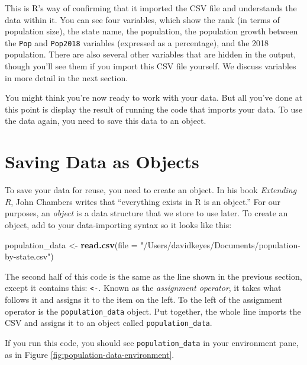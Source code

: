 \documentclass[
]{book}
\newenvironment{Shaded}{\begin{snugshade}}{\end{snugshade}}
\newcommand{\AttributeTok}[1]{\textcolor[rgb]{0.13,0.29,0.53}{#1}}
\newcommand{\FunctionTok}[1]{\textcolor[rgb]{0.13,0.29,0.53}{\textbf{#1}}}
\newcommand{\NormalTok}[1]{#1}
\newcommand{\OtherTok}[1]{\textcolor[rgb]{0.56,0.35,0.01}{#1}}
\newcommand{\StringTok}[1]{\textcolor[rgb]{0.31,0.60,0.02}{#1}}
\begin{document}
This is R's way of confirming that it imported the CSV file and understands the data within it. You can see four variables, which show the rank (in terms of population size), the state name, the population, the population growth between the \texttt{Pop} and \texttt{Pop2018} variables (expressed as a percentage), and the 2018 population. There are also several other variables that are hidden in the output, though you'll see them if you import this CSV file yourself. We discuss variables in more detail in the next section.

You might think you're now ready to work with your data. But all you've done at this point is display the result of running the code that imports your data. To use the data again, you need to save this data to an object.

\hypertarget{saving-data-as-objects}{%
\section*{Saving Data as Objects}\label{saving-data-as-objects}}

To save your data for reuse, you need to create an object. In his book \emph{Extending R}, John Chambers writes that ``everything exists in R is an object.'' For our purposes, an \emph{object} is a data structure that we store to use later. To create an object, add to your data-importing syntax so it looks like this:

\begin{Shaded}
\begin{Highlighting}[]
\NormalTok{population\_data }\OtherTok{\textless{}{-}} \FunctionTok{read.csv}\NormalTok{(}\AttributeTok{file =} \StringTok{"/Users/davidkeyes/Documents/population{-}by{-}state.csv"}\NormalTok{)}
\end{Highlighting}
\end{Shaded}

The second half of this code is the same as the line shown in the previous section, except it contains this: \texttt{\textless{}-}. Known as the \emph{assignment operator}, it takes what follows it and assigns it to the item on the left. To the left of the assignment operator is the \texttt{population\_data} object. Put together, the whole line imports the CSV and assigns it to an object called \texttt{population\_data}.

If you run this code, you should see \texttt{population\_data} in your environment pane, as in Figure \ref{fig:population-data-environment}.
\end{document}
